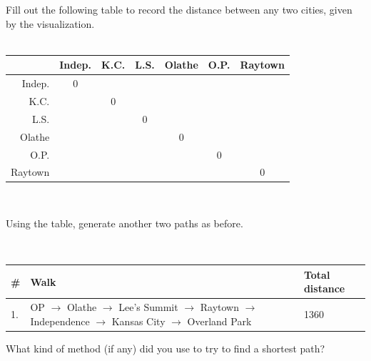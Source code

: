     \newpage
    
    \begin{questionNOGRADE}{\thequestion}
        Fill out the following table to record the distance between any two cities,
        given by the visualization.
        ~\\~\\
        \Large 
        \begin{tabular}{r | c | c | c | c | c | c}
                    & Indep.    & K.C.      & L.S.  & Olathe    & O.P.      & Raytown
            \\ \hline
            Indep.  & 0         &          &     &         &         & 
            \\ \hline
            K.C.    &          & 0         &     &         &         & 
            \\ \hline
            L.S.    &         &         & 0     &         &        & 
            \\ \hline
            Olathe  &         &         &     & 0         &         & 
            \\ \hline
            O.P.    &         &         &     &        & 0         & 
            \\ \hline
            Raytown &          &          &      &         &         & 0
        \end{tabular}
        ~\\
    \end{questionNOGRADE}

    \hrulefill

    \begin{questionNOGRADE}{\thequestion}
        Using the table, generate another two paths as before.

        ~\\
        \begin{tabular}{ | l | p{9cm} | l |}
            \hline
            \# & Walk & Total distance
            \\ \hline
            1. & OP $\to$ Olathe $\to$ Lee's Summit $\to$ Raytown $\to$ Independence $\to$ Kansas City $\to$ Overland Park & 1360
            \\ \hline
        \end{tabular}

        \vspace{5cm}
        What kind of method (if any) did you use to try to find a shortest path?
        
        
    \end{questionNOGRADE}




    

    


